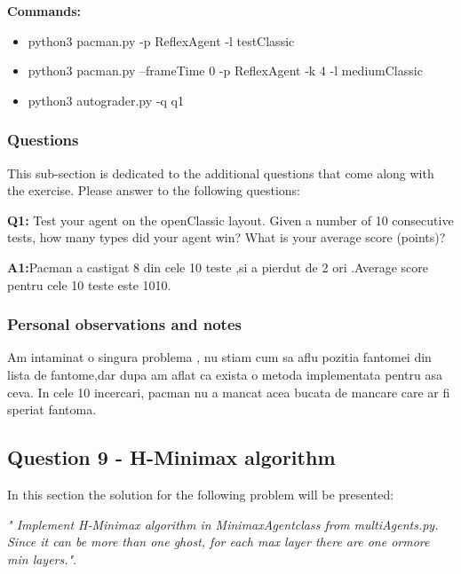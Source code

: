 \textbf{Commands:}
\begin{itemize}
    \setlength\itemsep{0em}
    \item  python3 pacman.py -p ReflexAgent -l testClassic
\item python3 pacman.py --frameTime 0 -p ReflexAgent -k 4 -l mediumClassic
\item python3 autograder.py -q q1
        
\end{itemize}

\subsubsection{Questions}
This sub-section is dedicated to the additional questions that come along with the exercise. Please answer to the following questions:\newline


\textbf{Q1:} Test your agent on the openClassic layout. Given a number of 10 consecutive tests, how many types did your agent win? What is your average score (points)?

\textbf{A1:}Pacman a castigat 8 din cele 10 teste  ,si a pierdut de 2 ori .Average score pentru cele 10 teste este 1010.

\subsubsection{Personal observations and notes}
Am intaminat o singura problema , nu stiam cum sa aflu pozitia fantomei din lista de fantome,dar dupa am aflat ca exista o metoda implementata pentru  asa ceva.
In cele 10 incercari, pacman nu a mancat acea bucata de mancare  care ar fi speriat fantoma.

\vspace{0.75cm}

\subsection{Question 9 - H-Minimax algorithm}
In this section the solution for the following problem will be presented: \newline

\textit{" Implement H-Minimax algorithm in MinimaxAgentclass from multiAgents.py. Since it can be more  than one ghost, for each max layer there are one ormore min layers."}.


